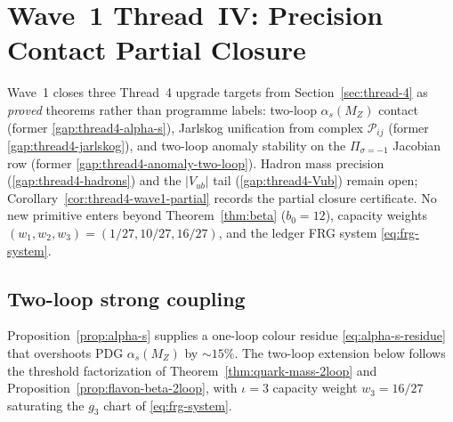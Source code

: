 \section{Wave~1 Thread~IV: Precision Contact Partial Closure}
\label{sec:wave1-thread4}

Wave~1 closes three Thread~4 upgrade targets from
Section~\ref{sec:thread-4} as \emph{proved} theorems rather than programme
labels: two-loop $\alpha_s(M_Z)$ contact (former \ref{gap:thread4-alpha-s}),
Jarlskog unification from complex $\mathcal{P}_{ij}$ (former
\ref{gap:thread4-jarlskog}), and two-loop anomaly stability on the
$\Pi_{\sigma=-1}$ Jacobian row (former \ref{gap:thread4-anomaly-two-loop}).
Hadron mass precision (\ref{gap:thread4-hadrons}) and the $|V_{ub}|$ tail
(\ref{gap:thread4-Vub}) remain open; Corollary~\ref{cor:thread4-wave1-partial}
records the partial closure certificate. No new primitive enters beyond
Theorem~\ref{thm:beta} ($b_0=12$), capacity weights
$(w_1,w_2,w_3)=(1/27,10/27,16/27)$, and the ledger FRG system
\eqref{eq:frg-system}.

\subsection{Two-loop strong coupling}
\label{sec:wave1-thread4:alpha-s}

Proposition~\ref{prop:alpha-s} supplies a one-loop colour residue
\eqref{eq:alpha-s-residue} that overshoots PDG $\alpha_s(M_Z)$ by
$\sim 15\%$. The two-loop extension below follows the threshold factorization
of Theorem~\ref{thm:quark-mass-2loop} and
Proposition~\ref{prop:flavon-beta-2loop}, with $\iota=3$ capacity weight
$w_3=16/27$ saturating the $g_3$ chart of \eqref{eq:frg-system}.

